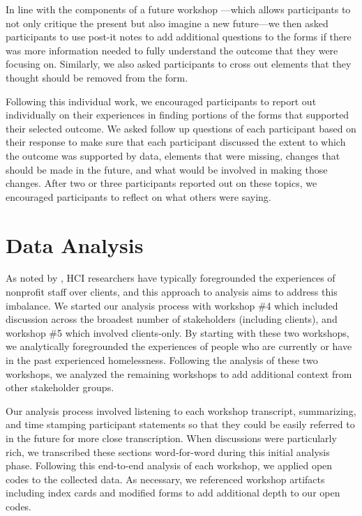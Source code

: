 In line with the components of a future workshop \citep{Jungk1987Future}---which allows participants to not only critique the present but also imagine a new future---we then asked participants to use post-it notes to add additional questions to the forms if there was more information needed to fully understand the outcome that they were focusing on. Similarly, we also asked participants to cross out elements that they thought should be removed from the form.

Following this individual work, we encouraged participants to report out individually on their experiences in finding portions of the forms that supported their selected outcome. We asked follow up questions of each participant based on their response to make sure that each participant discussed the extent to which the outcome was supported by data, elements that were missing, changes that should be made in the future, and what would be involved in making those changes. After two or three participants reported out on these topics, we encouraged participants to reflect on what others were saying.

\section{Data Analysis}
As noted by \citet{Bopp2019Voices}, HCI researchers have typically foregrounded the experiences of nonprofit staff over clients, and this approach to analysis aims to address this imbalance. We started our analysis process with workshop \#4 which included discussion across the broadest number of stakeholders (including clients), and workshop \#5 which involved clients-only. By starting with these two workshops, we analytically foregrounded the experiences of people who are currently or have in the past experienced homelessness. Following the analysis of these two workshops, we analyzed the remaining workshops to add additional context from other stakeholder groups.

Our analysis process involved listening to each workshop transcript, summarizing, and time stamping participant statements so that they could be easily referred to in the future for more close transcription. When discussions were particularly rich, we transcribed these sections word-for-word during this initial analysis phase. Following this end-to-end analysis of each workshop, we applied open codes to the collected data. As necessary, we referenced workshop artifacts including index cards and modified forms to add additional depth to our open codes.

